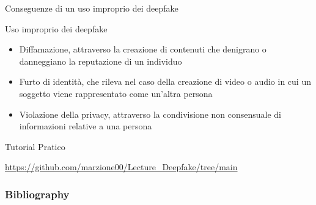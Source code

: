 \documentclass[11pt]{beamer}
\begin{document}
\begin{frame}{Conseguenze di un uso improprio dei deepfake \cite{deepfake_jus}}
\begin{alertblock}{Uso improprio dei deepfake}
\begin{itemize}
\item Diffamazione, attraverso la creazione di contenuti che denigrano o danneggiano la reputazione di un individuo
\item Furto di identità, che rileva nel caso della creazione di video o audio in cui un soggetto viene rappresentato come un’altra persona
\item Violazione della privacy, attraverso la condivisione non consensuale di informazioni relative a una persona
\end{itemize}
\end{alertblock}
\end{frame}


\begin{frame}{Tutorial Pratico \cite{foster2022generative}}
\begin{center}
\end{center}
\begin{center}
\url{https://github.com/marzione00/Lecture_Deepfake/tree/main}
\end{center}
\end{frame}








\begin{frame}[t,allowframebreaks]
\frametitle{Bibliography}
\printbibliography
\end{frame}
\end{document}
